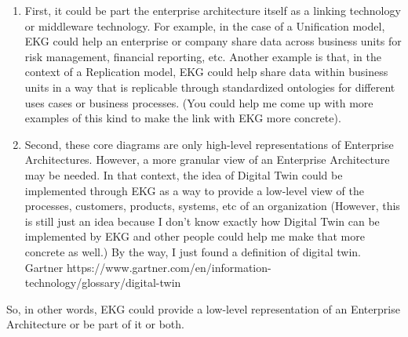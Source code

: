\begin{enumerate}
    \item First, it could be part the enterprise architecture itself as a linking technology or middleware technology.
    For example, in the case of a Unification model, EKG could help an enterprise or company share data across
    business units for risk management, financial reporting, etc. Another example is that, in the context of a
    Replication model, EKG could help share data within business units in a way that is replicable through
    standardized ontologies for different uses cases or business processes.
    (You could help me come up with more examples of this kind to make the link with EKG more concrete).
    \item Second, these core diagrams are only high-level representations of Enterprise Architectures.
    However, a more granular view of an Enterprise Architecture may be needed. In that context, the idea of
    Digital Twin could be implemented through EKG as a way to provide a low-level view of the processes,
    customers, products, systems, etc of an organization
    (However, this is still just an idea because I don’t know exactly how Digital Twin can be implemented by EKG
    and other people could help me make that more concrete as well.)
    By the way, I just found a definition of digital twin.
    {Gartner}
    {https://www.gartner.com/en/information-technology/glossary/digital-twin}
\end{enumerate}

So, in other words, EKG could provide a low-level representation of an Enterprise Architecture or be part of it or both.
